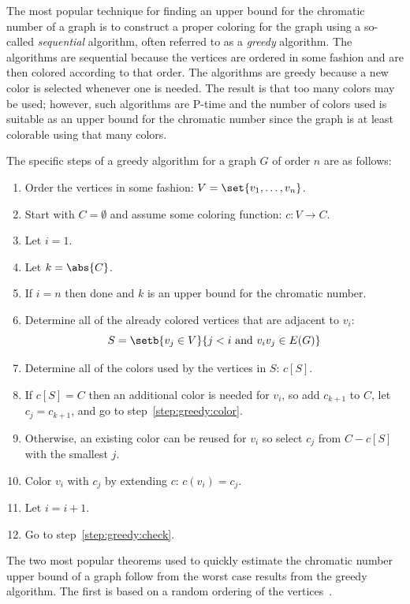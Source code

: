The most popular technique for finding an upper bound for the chromatic number of a graph is to construct a proper
coloring for the graph using a so-called \emph{sequential} algorithm, often referred to as a \emph{greedy}
algorithm.  The algorithms are sequential because the vertices are ordered in some fashion and are then colored
according to that order.  The algorithms are greedy because a new color is selected whenever one is needed.  The
result is that too many colors may be used; however, such algorithms are P-time and the number of colors used is
suitable as an upper bound for the chromatic number since the graph is at least colorable using that many colors.

The specific steps of a greedy algorithm for a graph \(G\) of order \(n\) are as follows:
\begin{enumerate}
\item Order the vertices in some fashion: \(V=\set{v_1,\ldots,v_n}\).
\item Start with \(C=\emptyset\) and assume some coloring function: \(c:V\to C\).
\item Let \(i=1\).
\item\label{step:greedy:check} Let \(k=\abs{C}\).
\item If \(i=n\) then done and \(k\) is an upper bound for the chromatic number.
\item Determine all of the already colored vertices that are adjacent to \(v_i\):
  \[S=\setb{v_j\in V}{j<i\ \text{and}\ v_iv_j\in E(G)}\]
\item Determine all of the colors used by the vertices in \(S\): \(c[S]\).
\item If \(c[S]=C\) then an additional color is needed for \(v_i\), so add \(c_{k+1}\) to \(C\), let
  \(c_j=c_{k+1}\), and go to step~\ref{step:greedy:color}.
\item Otherwise, an existing color can be reused for \(v_i\) so select \(c_j\) from \(C-c[S]\) with the smallest
  \(j\).
\item\label{step:greedy:color} Color \(v_i\) with \(c_j\) by extending \(c\): \(c(v_i)=c_j\).
\item Let \(i=i+1\).
\item Go to step~\ref{step:greedy:check}.
\end{enumerate}

The two most popular theorems used to quickly estimate the chromatic number upper bound of a graph follow from the
worst case results from the greedy algorithm.  The first is based on a random ordering of the
vertices~\cite{chartrand}.

